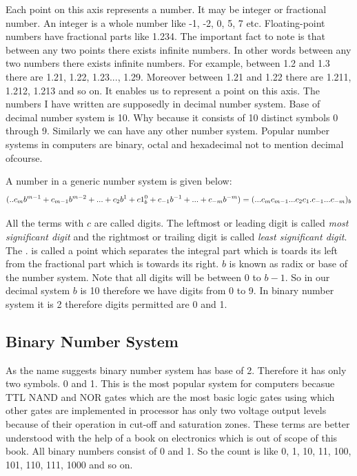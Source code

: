 Each point on this axis represents a number. It may be integer or fractional
number. An integer is a whole number like -1, -2, 0, 5, 7 etc. Floating-point
numbers have fractional parts like 1.234. The important fact to note is that
between any two points there exists infinite numbers. In other words between
any two numbers there exists infinite numbers. For example, between 1.2 and 1.3
there are 1.21, 1.22, 1.23..., 1.29. Moreover between 1.21 and 1.22 there are
1.211, 1.212, 1.213 and so on. It enables us to represent a point on this
axis. The numbers I have written are supposedly in decimal number system. Base
of decimal number system is 10. Why because it consists of 10 distinct symbols
0 through 9. Similarly we can have any other number system. Popular number
systems in computers are binary, octal and hexadecimal not to mention decimal
ofcourse.

A number in a generic number system is given below:
$$(.. c_mb^{m-1} + c_{m-1}b^{m-2}+ ... + c_2b^1 + c1_b^0 + c_{-1}b^{-1} +
... + c_{-m}b^{-m} ) \\ = (... c_mc_{m-1}...c_2c_1.c_{-1}...c_{-m})_b$$

All the terms with $c$  are called digits. The leftmost or leading digit is
called \textit{most significant digit} and the rightmost or trailing digit is
called \textit{least significant digit}. The . is called a point which
separates the integral part which is toards its left from the fractional part
which is towards its right. $b$  is known as radix or base of the number
system. Note that all digits will be between $0$ to $b-1$. So in our decimal
system $b$  is 10 therefore we have digits from 0 to 9. In binary number system
it is 2 therefore digits permitted are 0 and 1.

\subsection{Binary Number System}
As the name suggests binary number system has base of 2. Therefore it has only
two symbols. 0 and 1. This is the most popular system for computers becasue TTL
NAND and NOR gates which are the most basic logic gates using which other gates
are implemented in processor has only two voltage output levels because of
their operation in cut-off and saturation zones. These terms are better
understood with the help of a book on electronics which is out of scope of this
book. All binary numbers consist of 0 and 1. So the count is like 0, 1, 10, 11,
100, 101, 110, 111, 1000 and so on.

